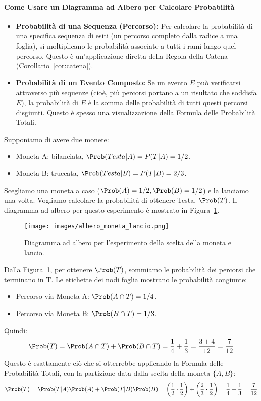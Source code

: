 \paragraph{Come Usare un Diagramma ad Albero per Calcolare Probabilità}
\begin{itemize}
    \item \textbf{Probabilità di una Sequenza (Percorso):} Per calcolare la probabilità di una specifica sequenza di esiti (un percorso completo dalla radice a una foglia), si moltiplicano le probabilità associate a tutti i rami lungo quel percorso. Questo è un'applicazione diretta della Regola della Catena (Corollario~\ref{cor:catena}).
    \item \textbf{Probabilità di un Evento Composto:} Se un evento $E$ può verificarsi attraverso più sequenze (cioè, più percorsi portano a un risultato che soddisfa $E$), la probabilità di $E$ è la somma delle probabilità di tutti questi percorsi disgiunti. Questo è spesso una visualizzazione della Formula delle Probabilità Totali.
\end{itemize}

\begin{example}
Supponiamo di avere due monete:
\begin{itemize}
    \item Moneta A: bilanciata, $\Prob(Testa|A) = P(T|A) = 1/2$.
    \item Moneta B: truccata, $\Prob(Testa|B) = P(T|B) = 2/3$.
\end{itemize}
Scegliamo una moneta a caso ($\Prob(A) = 1/2, \Prob(B) = 1/2$) e la lanciamo una volta. Vogliamo calcolare la probabilità di ottenere Testa, $\Prob(T)$. Il diagramma ad albero per questo esperimento è mostrato in Figura~\ref{fig:albero_moneta_lancio}.

\begin{figure}[H] %
    \centering
    \texttt{[image: images/albero\_moneta\_lancio.png]}
    \caption{Diagramma ad albero per l'esperimento della scelta della moneta e lancio.}
    \label{fig:albero_moneta_lancio}
\end{figure}

Dalla Figura~\ref{fig:albero_moneta_lancio}, per ottenere $\Prob(T)$, sommiamo le probabilità dei percorsi che terminano in T. Le etichette dei nodi foglia mostrano le probabilità congiunte:
\begin{itemize}
    \item Percorso via Moneta A: $\Prob(A \cap T) = 1/4$.
    \item Percorso via Moneta B: $\Prob(B \cap T) = 1/3$.
\end{itemize}
Quindi:
\[ \Prob(T) = \Prob(A \cap T) + \Prob(B \cap T) = \frac{1}{4} + \frac{1}{3} = \frac{3+4}{12} = \frac{7}{12} \]
Questo è esattamente ciò che si otterrebbe applicando la Formula delle Probabilità Totali, con la partizione data dalla scelta della moneta $\{A, B\}$:
\[ \Prob(T) = \Prob(T|A)\Prob(A) + \Prob(T|B)\Prob(B) = \left(\frac{1}{2} \cdot \frac{1}{2}\right) + \left(\frac{2}{3} \cdot \frac{1}{2}\right) = \frac{1}{4} + \frac{1}{3} = \frac{7}{12} \]
\end{example}

